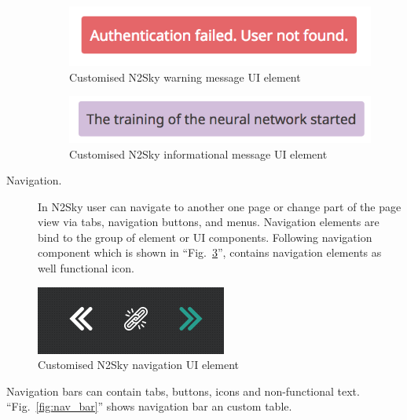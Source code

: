 \begin{description}
\begin{figure}[htbp]
\begin{center}
  \includegraphics[scale=0.65]{components/3/components/notif_warning.png}
  \caption{Customised N2Sky warning message UI element}
  \label{fig:notif_warning}
\end{center}
\end{figure}

\begin{figure}[htbp]
\begin{center}
  \includegraphics[scale=0.65]{components/3/components/notif_info.png}
  \caption{Customised N2Sky informational message UI element}
  \label{fig:notif_info}
\end{center}
\end{figure}

\item[Navigation.] In N2Sky user can navigate to another one page or change part of the page view via tabs, navigation buttons, and menus. 
Navigation elements are bind to the group of element or UI components. Following navigation component which is shown in ``Fig.~\ref{fig:nav}'', contains navigation elements as well functional icon. 
\end{description}

\begin{figure}[htbp]
\begin{center}
  \includegraphics[scale=0.65]{components/3/components/nav.png}
  \caption{Customised N2Sky navigation UI element}
  \label{fig:nav}
\end{center}
\end{figure}

Navigation bars can contain tabs, buttons, icons and non-functional text. ``Fig.~\ref{fig:nav_bar}'' shows navigation bar an custom table. 

